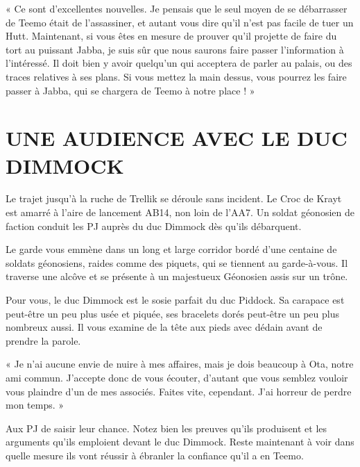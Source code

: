 \documentclass[a4paper,10pt,twoside,twocolumn,openany]{book}
\begin{document}
\begin{quotebox}
 
« Ce sont d’excellentes nouvelles. Je pensais que
le seul moyen de se débarrasser de Teemo était
de l’assassiner, et autant vous dire qu’il n’est pas
facile de tuer un Hutt. Maintenant, si vous êtes en
mesure de prouver qu’il projette de faire du tort
au puissant Jabba, je suis sûr que nous saurons
faire passer l’information à l’intéressé. Il doit bien y
avoir quelqu’un qui acceptera de parler au palais,
ou des traces relatives à ses plans. Si vous mettez la main dessus, vous pourrez les faire passer à
Jabba, qui se chargera de Teemo à notre place ! »
   
\end{quotebox}

\section{UNE AUDIENCE AVEC LE
DUC DIMMOCK}
Le trajet jusqu’à la ruche de Trellik se déroule sans incident. Le Croc de Krayt est amarré à l’aire de lancement
AB14, non loin de l’AA7. Un soldat géonosien de faction conduit les PJ auprès du duc Dimmock dès qu’ils
débarquent.

   
\begin{quotebox}
Le garde vous emmène dans un long et large corridor bordé d’une centaine de soldats géonosiens,
raides comme des piquets, qui se tiennent au
garde-à-vous. Il traverse une alcôve et se présente
à un majestueux Géonosien assis sur un trône.

Pour vous, le duc Dimmock est le sosie parfait du
duc Piddock. Sa carapace est peut-être un peu plus
usée et piquée, ses bracelets dorés peut-être un
peu plus nombreux aussi. Il vous examine de la tête
aux pieds avec dédain avant de prendre la parole.

« Je n’ai aucune envie de nuire à mes affaires, mais
je dois beaucoup à Ota, notre ami commun. J’accepte donc de vous écouter, d’autant que vous
semblez vouloir vous plaindre d’un de mes associés. Faites vite, cependant. J’ai horreur de perdre
mon temps. »
   
\end{quotebox}

Aux PJ de saisir leur chance. Notez bien les preuves
qu’ils produisent et les arguments qu’ils emploient devant le duc Dimmock. Reste maintenant à voir dans
quelle mesure ils vont réussir à ébranler la confiance qu’il
a en Teemo.

\subtitle{POINTS POSITIFS}
\end{document}
